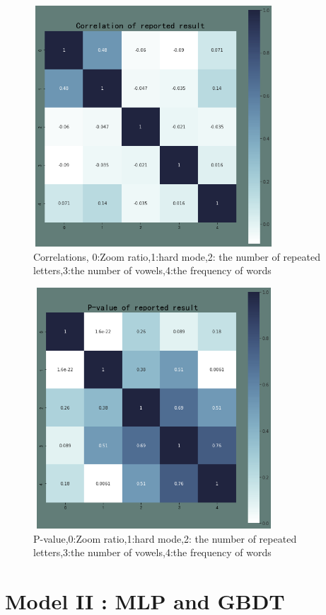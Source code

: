 \documentclass[12pt]{article}
\begin{document}
\begin{figure}
	
	\centering
	
	\includegraphics[height=9cm, width=9cm]{COR_m1_re.png}
	\caption{Correlations, 0:Zoom ratio,1:hard mode,2: the number of repeated letters,3:the number of vowels,4:the frequency of words}
	\end{figure}
	
\begin{figure}[htbp]
	
		\centering
		\includegraphics[height=9cm, width=9cm]{Per_m1_re.png}
		\caption{P-value,0:Zoom ratio,1:hard mode,2: the number of repeated letters,3:the number of vowels,4:the frequency of words}
	
\end{figure}
\newpage{}
\section{Model II : MLP and GBDT}
\end{document}
